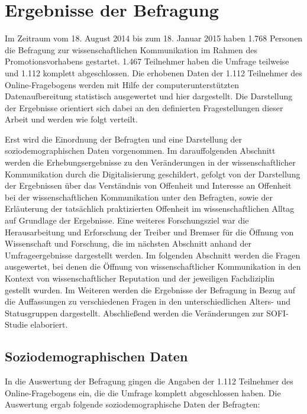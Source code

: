 \section{Ergebnisse der Befragung}

Im Zeitraum vom 18. August 2014 bis zum 18. Januar 2015 haben 1.768 Personen die Befragung zur wissenschaftlichen Kommunikation im Rahmen des Promotionsvorhabens gestartet. 1.467 Teilnehmer haben die Umfrage teilweise und 1.112 komplett abgeschlossen. Die erhobenen Daten der 1.112 Teilnehmer des Online-Fragebogens werden mit Hilfe der computerunterstützten Datenaufbereitung statistisch ausgewertet und hier dargestellt. Die Darstellung der Ergebnisse orientiert sich dabei an den definierten Fragestellungen dieser Arbeit und werden wie folgt verteilt.

Erst wird die Einordnung der Befragten und eine Darstellung der soziodemographischen Daten vorgenommen. Im darauffolgenden Abschnitt werden die Erhebungsergebnisse zu den Veränderungen in der wissenschaftlicher Kommunikation durch die Digitalisierung geschildert, gefolgt von der Darstellung der Ergebnissen über das Verständnis von Offenheit und Interesse an Offenheit bei der wissenschaftlichen Kommunikation unter den Befragten, sowie der Erläuterung der tatsächlich praktizierten Offenheit im wissenschaftlichen Alltag auf Grundlage der Ergebnisse. Eine weiteres Forschungsziel war die Herausarbeitung und Erforschung der Treiber und Bremser für die Öffnung von Wissenschaft und Forschung, die im nächsten Abschnitt anhand der Umfrageergebnisse dargestellt werden. Im folgenden Abschnitt werden die Fragen ausgewertet, bei denen die Öffnung von wissenschaftlicher Kommunikation in den Kontext von wissenschaftlicher Reputation und der jeweiligen Fachdiziplin gestellt wurden. Im Weiteren werden die Ergebnisse der Befragung in Bezug auf die Auffassungen zu verschiedenen Fragen in den unterschiedlichen Alters- und Statusgruppen dargestellt. Abschließend werden die Veränderungen zur SOFI-Studie elaboriert.

\subsection{Soziodemographischen Daten}

In die Auswertung der Befragung gingen die Angaben der 1.112 Teilnehmer des Online-Fragebogens ein, die die Umfrage komplett abgeschlossen haben. Die Auswertung ergab folgende soziodemographische Daten der Befragten:

